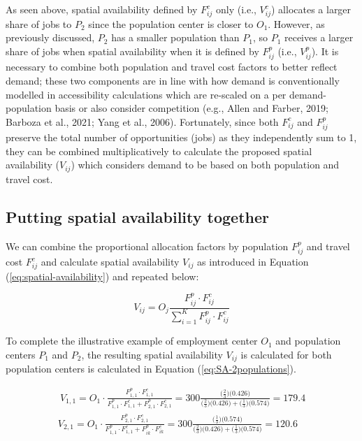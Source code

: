\documentclass[]{elsarticle} %
\begin{document}
As seen above, spatial availability defined by \(F^c_{ij}\) only (i.e.,
\(V^c_{ij}\)) allocates a larger share of jobs to \(P_2\) since the
population center is closer to \(O_1\). However, as previously
discussed, \(P_2\) has a smaller population than \(P_1\), so \(P_1\)
receives a larger share of jobs when spatial availability when it is
defined by \(F^p_{ij}\) (i.e., \(V^p_{ij}\)). It is necessary to combine
both population and travel cost factors to better reflect demand; these
two components are in line with how demand is conventionally modelled in
accessibility calculations which are re-scaled on a per
demand-population basis or also consider competition (e.g., Allen and
Farber, 2019; Barboza et al., 2021; Yang et al., 2006). Fortunately,
since both \(F^c_{ij}\) and \(F^p_{ij}\) preserve the total number of
opportunities (jobs) as they independently sum to 1, they can be
combined multiplicatively to calculate the proposed spatial availability
(\(V_{ij}\)) which considers demand to be based on both population and
travel cost.

\hypertarget{putting-spatial-availability-together}{%
\subsection{Putting spatial availability
together}\label{putting-spatial-availability-together}}

We can combine the proportional allocation factors by population
\(F^p_{ij}\) and travel cost \(F^c_{ij}\) and calculate spatial
availability \(V_{ij}\) as introduced in Equation
(\ref{eq:spatial-availability}) and repeated below:

\[
V_{ij} = O_j\frac{F^p_{ij} \cdot F^c_{ij}}{\sum_{i=1}^K F^p_{ij} \cdot F^c_{ij}}
\]

To complete the illustrative example of employment center \(O_1\) and
population centers \(P_1\) and \(P_2\), the resulting spatial
availability \(V_{ij}\) is calculated for both population centers is
calculated in Equation (\ref{eq:SA-2populations}).

\begin{equation}
\label{eq:SA-2populations}
\begin{array}{l}\
V_{1,1} = O_1\cdot \frac{F^p_{1,1} \cdot F^c_{1,1}}{F^p_{1,1} \cdot F^c_{1,1} + F^p_{2,1} \cdot F^c_{2,1}} = 300 \frac{\big(\frac{2}{3} \big) \big(0.426 \big)}{\big(\frac{2}{3} \big) \big(0.426 \big) + \big(\frac{1}{3} \big) \big(0.574 \big)} = 179.4\\
V_{2,1} = O_1\cdot \frac{F^p_{2,1} \cdot F^c_{2,1}}{F^p_{1,1} \cdot F^c_{1,1} + F^p_{ik} \cdot F^c_{ik}} = 300 \frac{\big(\frac{1}{3} \big) \big(0.574 \big)}{\big(\frac{2}{3} \big) \big(0.426 \big) + \big(\frac{1}{3} \big) \big(0.574 \big)}  =  120.6 \\
\end{array}
\end{equation}
\end{document}
